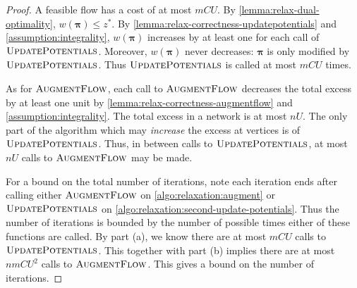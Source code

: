 \begin{proof}
A feasible flow has a cost of at most $mCU$. By \cref{lemma:relax-dual-optimality}, $w\left(\boldsymbol{\pi}\right) \leq z^*$. By \cref{lemma:relax-correctness-updatepotentials} and \cref{assumption:integrality}, $w\left(\boldsymbol{\pi}\right)$ increases by at least one for each call of $\textproc{UpdatePotentials}$. Moreover, $w\left(\boldsymbol{\pi}\right)$ never decreases: $\boldsymbol{\pi}$ is only modified by $\textproc{UpdatePotentials}$. Thus $\textproc{UpdatePotentials}$ is called at most $mCU$ times.

As for $\textproc{AugmentFlow}$, each call to $\textproc{AugmentFlow}$ decreases the total excess by at least one unit by \cref{lemma:relax-correctness-augmentflow} and \cref{assumption:integrality}. The total excess in a network is at most $nU$. The only part of the algorithm which may \emph{increase} the excess at vertices is  of $\textproc{UpdatePotentials}$. Thus, in between calls to $\textproc{UpdatePotentials}$, at most $nU$ calls to $\textproc{AugmentFlow}$ may be made.

For a bound on the total number of iterations, note each iteration ends after calling either $\textproc{AugmentFlow}$ on \cref{algo:relaxation:augment} or $\textproc{UpdatePotentials}$ on \cref{algo:relaxation:second-update-potentials}\footnotemark. Thus the number of iterations is bounded by the number of possible times either of these functions are called. By part (a), we know there are at most $mCU$ calls to $\textproc{UpdatePotentials}$. This together with part (b) implies there are at most $nmCU^2$ calls to $\textproc{AugmentFlow}$. This gives a bound on the number of iterations.
\end{proof}

